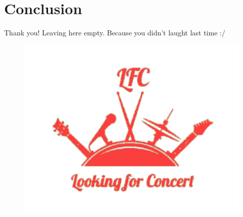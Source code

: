 \documentclass{beamer}
\begin{document}
\section
  {Conclusion}

\begin{frame}{Thank you!}
	Leaving here empty. Because you didn't laught last time :/
	\begin{figure}[t]
		\centering
		\includegraphics[height=\dimexpr6\textheight/16\relax]{images/logodark}
	\end{figure}
\end{frame}
\end{document}

